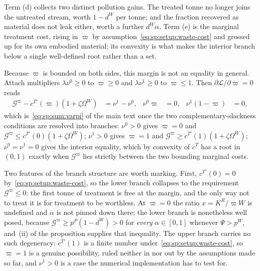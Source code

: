 Term (d) collects two distinct pollution gains. The treated tonne no longer joins the untreated stream, worth $1-d^W$ per tonne; and the fraction recovered as material does not leak either, worth a further $d^W\alpha$. Term (e) is the marginal treatment cost, rising in $\varpi$ by assumption~\eqref{eq:sp:setup:waste-cost} and grossed up for its own embodied material; its convexity is what makes the interior branch below a single well-defined root rather than a set.

 Because $\varpi$ is bounded on both sides, this margin is
not an equality in general. Attach multipliers $\lambda\nu^0\ge0$ to $\varpi\ge0$ and
$\lambda\nu^1\ge0$ to $\varpi\le1$. Then $\partial\mathcal L/\partial\varpi=0$ reads
\begin{align}
\mathcal G^\varpi-c^{T\prime}\left(\varpi\right)\left(1+\zeta\Omega^W\right)
&= \nu^1-\nu^0,
&
\nu^0\varpi &= 0,
&
\nu^1\left(1-\varpi\right) &= 0,
\label{eq:sp:foc:varpi-kkt}
\end{align}
which is~\eqref{eq:sp:sum:varpi} of the main text once the two complementary-slackness conditions are
resolved into branches: $\nu^0>0$ gives $\varpi=0$ and
$\mathcal G^\varpi\le c^{T\prime}\left(0\right)\left(1+\zeta\Omega^W\right)$; $\nu^1>0$ gives
$\varpi=1$ and $\mathcal G^\varpi\ge c^{T\prime}\left(1\right)\left(1+\zeta\Omega^W\right)$;
$\nu^0=\nu^1=0$ gives the interior equality, which by convexity of $c^T$ has a root in
$\left(0,1\right)$ exactly when $\mathcal G^\varpi$ lies strictly between the two bounding marginal
costs.

Two features of the branch structure are worth marking. First,
$c^{T\prime}\left(0\right)=0$ by~\eqref{eq:sp:setup:waste-cost}, so the lower branch collapses to the
requirement $\mathcal G^\varpi\le0$: the first tonne of treatment is free at the margin, and the only
way not to treat it is for treatment to be worthless. At $\varpi=0$ the
ratio $x=K^R/\varpi W$ is undefined and $\alpha$ is not pinned down there; the lower branch is
nonetheless well posed, because $\mathcal G^\varpi\ge p^P\left(1-d^W\right)>0$ for \emph{every}
$\alpha\in\left[0,1\right]$ whenever $\Psi>p^W$, and~(ii) of the proposition supplies that inequality.
The upper branch carries no such degeneracy: $c^{T\prime}\left(1\right)$ is a finite number
under~\eqref{eq:sp:setup:waste-cost}, so $\varpi=1$ is a genuine possibility, ruled neither in nor out
by the assumptions made so far, and $\nu^1>0$ is a case the numerical implementation has to test for.

